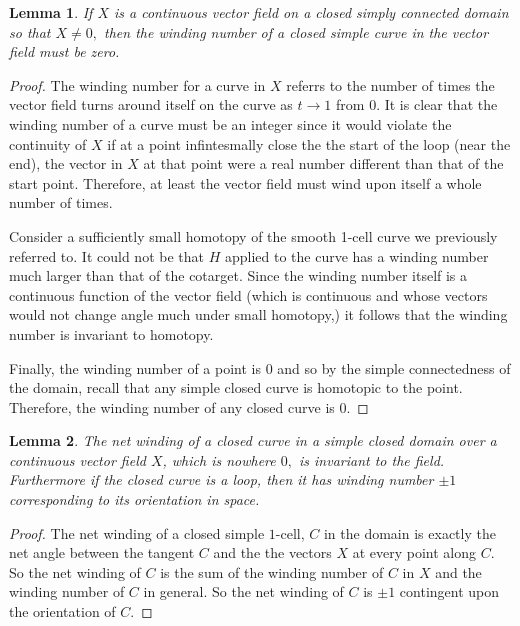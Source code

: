 \documentclass[letter]{article}
\newtheorem{lemma}{Lemma}
\newenvironment{menumerate}{%
  \edef\backupindent{\the\parindent}%
  \enumerate%
  \setlength{\parindent}{\backupindent}%
}{\endenumerate}
\begin{document}
\begin{menumerate}
    \begin{lemma}
        If $X$ is a continuous vector field on a closed simply connected
        domain so that $X \neq 0,$ then the winding number of a
        closed simple curve in the vector field must be zero.
    \end{lemma}
    \begin{proof}
        The winding number for a curve in $X$ referrs to the number 
        of times the vector field turns around itself on the curve
        as $t \to 1$ from $0.$ It is clear that the winding number of a curve must be an
        integer since it would violate the continuity of $X$ if 
        at a point infintesmally close the the start of the loop (near the end), the vector
        in $X$ at that point were a real number different than that of the start point.
        Therefore, at least the vector field must wind upon itself a whole number of times.

        Consider a sufficiently small homotopy of the smooth 1-cell curve we previously 
        referred to. It could not be that $H$ applied to the curve has 
        a winding number much larger than that of the cotarget. Since the winding 
        number itself is a continuous function of the vector field (which is continuous and whose
        vectors would not change angle much under small homotopy,) it follows that
        the winding number is invariant to homotopy.

        Finally, the winding number of a point is $0$ and
        so by the simple connectedness of the domain, recall that any
         simple closed curve is homotopic to the point. Therefore, the winding number of 
         any closed curve is $0.$
    \end{proof}

    \begin{lemma}
        The net winding of a closed curve in a simple closed domain over a continuous vector
        field $X$, which is nowhere $0,$ is invariant to the field. Furthermore
        if the closed curve is a loop, then it has winding number $\pm 1$ corresponding to
        its orientation in space. 
    \end{lemma}
    \begin{proof}
        The net winding of a closed simple $1$-cell, $C$ in the domain is exactly 
        the net angle between the tangent $C$ and the the vectors $X$ at every point along
        $C.$ So the net winding of $C$ is the sum of the winding number of
        $C$ in $X$ and the winding number of $C$ in general. So the net winding of $C$
        is $\pm 1$ contingent upon the orientation of $C.$
    \end{proof}


\end{menumerate}
\end{document}
